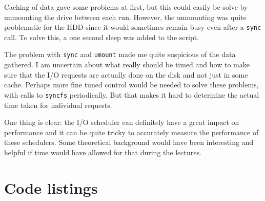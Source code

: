 \documentclass[12pt, a4paper]{article} %
\begin{document}
Caching of data gave some problems at first, but this could easily be solve by unmounting the drive between each run.
However, the unmounting was quite problematic for the HDD since it would sometimes remain busy even after a \texttt{sync} call.
To solve this, a one second sleep was added to the script.

The problem with \texttt{sync} and \texttt{umount} made me quite suspicious of the data gathered.
I am uncertain about what really should be timed and how to make sure that the I/O requests are actually done on the disk and not just in some cache.
Perhaps more fine tuned control would be needed to solve these problems, with calls to \texttt{syncfs} periodically.
But that makes it hard to determine the actual time taken for individual requests.

One thing is clear: the I/O scheduler can definitely have a great impact on performance and it can be quite tricky to accurately measure the performance of these schedulers.
Some theoretical background would have been interesting and helpful if time would have allowed for that during the lectures.

\clearpage
\appendix

\section{Code listings}


















\end{document}

